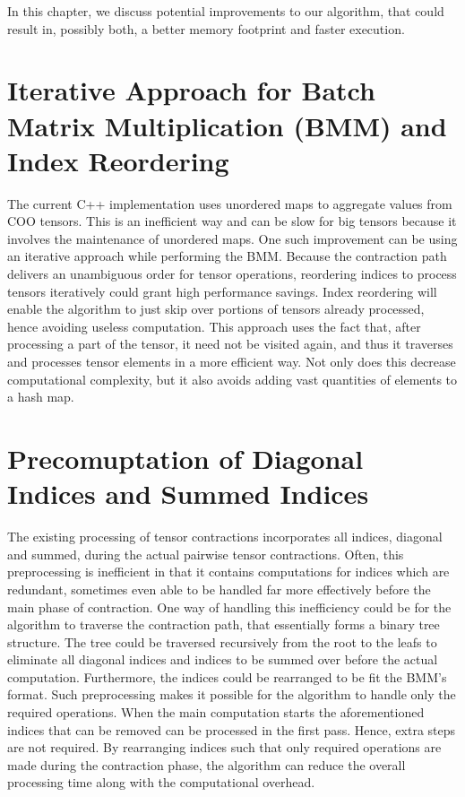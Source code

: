 In this chapter, we discuss potential improvements to our algorithm, that could result in, 
possibly both, a better memory footprint and faster execution.

\section{Iterative Approach for Batch Matrix Multiplication (BMM) and Index Reordering}
The current C++ implementation uses unordered maps to aggregate values from COO tensors. 
This is an inefficient way and can be slow for big tensors because it involves the 
maintenance of unordered maps. One such improvement can be using an iterative approach 
while performing the BMM. Because the contraction path delivers an unambiguous order for 
tensor operations, reordering indices to process tensors iteratively could grant high 
performance savings. Index reordering will enable the algorithm to just skip over portions 
of tensors already processed, hence avoiding useless computation. This approach uses the 
fact that, after processing a part of the tensor, it need not be visited again, and thus 
it traverses and processes tensor elements in a more efficient way. Not only does this 
decrease computational complexity, but it also avoids adding vast quantities of elements 
to a hash map.

\section{Precomuptation of Diagonal Indices and Summed Indices}
The existing processing of tensor contractions incorporates all indices, diagonal and summed, 
during the actual pairwise tensor contractions. Often, this preprocessing is inefficient in 
that it contains computations for indices which are redundant, sometimes even able to be 
handled far more effectively before the main phase of contraction. One way of handling this 
inefficiency could be for the algorithm to traverse the contraction path, that essentially 
forms a binary tree structure. The tree could be traversed recursively from the root to the 
leafs to eliminate all diagonal indices and indices to be summed over before the actual 
computation. Furthermore, the indices could be rearranged to be fit the BMM's format. 
Such preprocessing makes it possible for the algorithm to handle only the required operations. 
When the main computation starts the aforementioned indices that can be removed can be 
processed in the first pass. Hence, extra steps are not required. By rearranging indices 
such that only required operations are made during the contraction phase, the algorithm can 
reduce the overall processing time along with the computational overhead.

